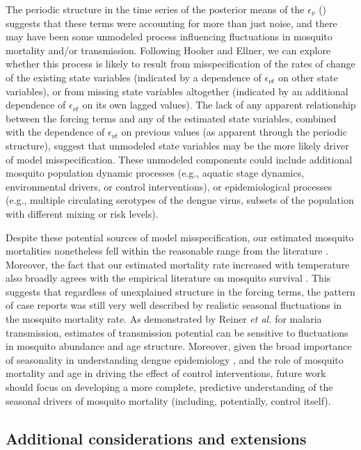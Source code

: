 \documentclass[10pt,letterpaper]{article}
\begin{document}
The periodic structure in the time series of the posterior means of the $\epsilon_{\nu}$ () suggests that these terms were accounting for more than just noise, and there may have been some unmodeled process influencing fluctuations in mosquito mortality and/or transmission.
Following Hooker and Ellner, we can explore whether this process is likely to result from misspecification of the rates of change of the existing state variables (indicated by a dependence of $\epsilon_{\nu t}$ on other state variables), or from missing state variables altogether (indicated by an additional dependence of $\epsilon_{\nu t}$ on its own lagged values). 
The lack of any apparent relationship between the forcing terms and any of the estimated state variables, combined with the dependence of $\epsilon_{\nu t}$ on previous values (as apparent through the periodic structure), suggest that unmodeled state variables may be the more likely driver of model misspecification.
These unmodeled components could include additional mosquito population dynamic processes (e.g., aquatic stage dynamics, environmental drivers, or control interventions), or epidemiological processes (e.g., multiple circulating serotypes of the dengue virus, subsets of the population with different mixing or risk levels).

Despite these potential sources of model misspecification, our estimated mosquito mortalities nonetheless fell within the reasonable range from the literature \cite{Maciel-de-Freitas2008, Brady2013}.
Moreover, the fact that our estimated mortality rate increased with temperature also broadly agrees with the empirical literature on mosquito survival \cite{Yang2009, Brady2013, Morin2013}.
This suggests that regardless of unexplained structure in the forcing terms, the pattern of case reports was still very well described by realistic seasonal fluctuations in the mosquito mortality rate.
As demonstrated by Reiner \emph{et al.} \cite{Reiner2015} for malaria transmission, estimates of transmission potential can be sensitive to fluctuations in mosquito abundance and age structure.
Moreover, given the broad importance of seasonality in understanding dengue epidemiology \cite{TenBosch2016}, and the role of mosquito mortality and age in driving the effect of control interventions, future work should focus on developing a more complete, predictive understanding of the seasonal drivers of mosquito mortality (including, potentially, control itself).

\subsection*{Additional considerations and extensions}
\end{document}
